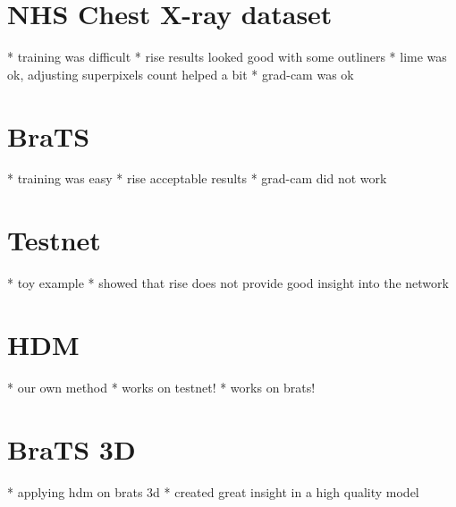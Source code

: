 \section{NHS Chest X-ray dataset}
* training was difficult
* rise results looked good with some outliners
* lime was ok, adjusting superpixels count helped a bit 
* grad-cam was ok

\section{BraTS}
* training was easy
* rise acceptable results
* grad-cam did not work

\section{Testnet}
* toy example
* showed that rise does not provide good insight into the network

\section{HDM}
* our own method
* works on testnet!
* works on brats!

\section{BraTS 3D}
* applying hdm on brats 3d
* created great insight in a high quality model
